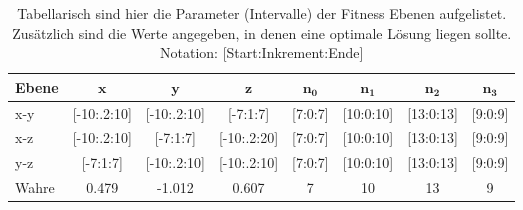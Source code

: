 \begin{table} [h]
	\begin{center}
		\caption[Parameter der Fitness Ebenen]{Tabellarisch sind hier die Parameter (Intervalle) der Fitness Ebenen aufgelistet. Zusätzlich sind die Werte angegeben, in denen eine optimale Lösung liegen sollte. Notation: [Start:Inkrement:Ende] }
		\label{tab:complexity1}
		\begin{tabular}{lccccccc}
		\textbf{Ebene} & $\mathbf{x}$ & $\mathbf{y}$ & $\mathbf{z}$ & $\mathbf{n_0}$ & $\mathbf{n_1}$& $\mathbf{n_2}$ & $\mathbf{n_3}$ \\
			\hline
			x-y & [-10:.2:10]		& [-10:.2:10]	& [-7:1:7] & [7:0:7] & [10:0:10]& [13:0:13]&[9:0:9]   \\
			x-z & [-10:.2:10] 	& [-7:1:7] 	& [-10:.2:20] & [7:0:7] & [10:0:10]& [13:0:13]&[9:0:9] \\
			y-z & [-7:1:7]  	& [-10:.2:10]	& [-10:.2:10] & [7:0:7] & [10:0:10]& [13:0:13]&[9:0:9]\\
			\hline
			Wahre & 0.479 & -1.012 & 0.607 & 7  & 10 & 13 & 9			\\
%
		\end{tabular}
	\end{center}
\end{table}